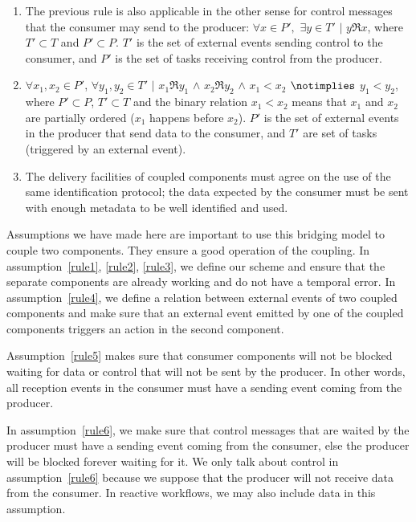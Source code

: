 {\begin{enumerate}
    \item The previous rule is also applicable in the other sense for control messages that the consumer may send to the producer: $\forall x \in P', $ $ \exists y \in T' $ $|$ $ y \Re x$,  where $T' \subset T$ and $P' \subset P$. $T'$  is the set of external events sending control to the consumer, and  $P'$ is the set of \deisa tasks receiving control from the producer.\label{rule6}  

    \item  $\forall x_1, x_2 \in P' $, $ \forall y_1, y_2 \in T' $ $ | $  $x_1 \Re y_1$ $ \wedge $ $x_2 \Re y_2 $  $ \wedge $  $ x_1 < x_2 $ $\notimplies$ $y_1 < y_2$, where $P' \subset P$, $T' \subset T$ and the binary relation $x_1 < x_2$ means that $x_1$ and $x_2$ are partially ordered ($x_1$ happens before $x_2$). $P'$ is the set of external events in the producer that send data to the consumer, and $T'$ are set of \deisa tasks (triggered by an external event).\label{rule7}

    \item The delivery facilities of coupled components must agree on the use of the same identification protocol; the data expected by the consumer must be sent with enough metadata to be well identified and used.\label{rule8}   
    
\end{enumerate}

Assumptions we have made here are important to use this bridging model to couple two components. They ensure a good operation of the coupling. In assumption~\ref{rule1}, \ref{rule2}, \ref{rule3}, we define our scheme and ensure that the separate components are already working and do not have a temporal error. In assumption~\ref{rule4}, we define a relation between external events of two coupled components and make sure that an external event emitted by one of the coupled components triggers an action in the second component. 

Assumption~\ref{rule5} makes sure that consumer components will not be blocked waiting for data or control that will not be sent by the producer. In other words, all reception events in the consumer must have a sending event coming from the producer. 

In assumption~\ref{rule6}, we make sure that control messages that are waited by the producer must have a sending event coming from the consumer, else the producer will be blocked forever waiting for it.  We only talk about control in assumption~\ref{rule6} because we suppose that the producer will not receive data from the consumer. In reactive workflows, we may also include data in this assumption. 

}
